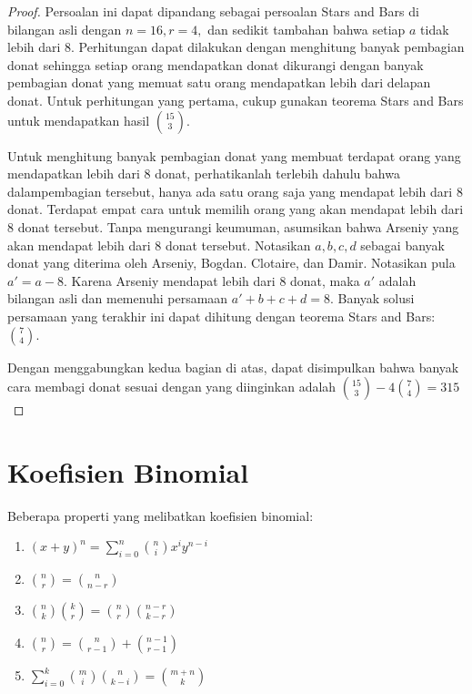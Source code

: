 \documentclass[11pt]{scrartcl}
\begin{document}
\begin{proof}
     Persoalan ini dapat dipandang sebagai persoalan Stars and Bars di bilangan asli dengan $n = 16, r = 4,$ dan sedikit tambahan bahwa setiap $a$ tidak lebih dari 8. Perhitungan dapat dilakukan dengan menghitung banyak pembagian donat sehingga setiap orang mendapatkan donat dikurangi dengan banyak pembagian donat yang memuat satu orang mendapatkan lebih dari delapan donat. Untuk perhitungan yang pertama, cukup gunakan teorema Stars and Bars untuk mendapatkan hasil $\binom{15}{3}$. 
     
     Untuk menghitung banyak pembagian donat yang membuat terdapat orang yang mendapatkan lebih dari 8 donat, perhatikanlah terlebih dahulu bahwa dalampembagian tersebut, hanya ada satu orang saja yang mendapat lebih dari 8 donat. Terdapat empat cara untuk memilih orang yang akan mendapat lebih dari 8 donat tersebut. Tanpa mengurangi keumuman, asumsikan bahwa Arseniy yang akan mendapat lebih dari 8 donat tersebut. Notasikan $a, b, c, d$ sebagai banyak donat yang diterima oleh Arseniy, Bogdan. Clotaire, dan Damir. Notasikan pula $a' = a - 8$. Karena Arseniy mendapat lebih dari 8 donat, maka $a'$ adalah bilangan asli dan memenuhi persamaan $a' + b + c + d = 8$. Banyak solusi persamaan yang terakhir ini dapat dihitung dengan teorema Stars and Bars: $\binom{7}{4}$. 
     
     Dengan menggabungkan kedua bagian di atas, dapat disimpulkan bahwa banyak cara membagi donat sesuai dengan yang diinginkan adalah $\binom{15}{3} - 4\binom{7}{4} = 315$
\end{proof}

\section{Koefisien Binomial}
Beberapa properti yang melibatkan koefisien binomial:
\begin{enumerate}
    \item $(x + y)^n = \sum_{i = 0}^n \binom{n}{i} x^iy^{n - i}$
    \item $\binom{n}{r} = \binom{n}{n - r}$
    \item $\binom{n}{k}\binom{k}{r} = \binom{n}{r}\binom{n - r}{k - r}$
    \item $\binom{n}{r} = \binom{n}{r - 1} + \binom{n - 1}{r - 1}$
    \item $\sum_{i = 0}^k \binom{m}{i}\binom{n}{k - i} = \binom{m + n}{k}$
\end{enumerate}
\end{document}
